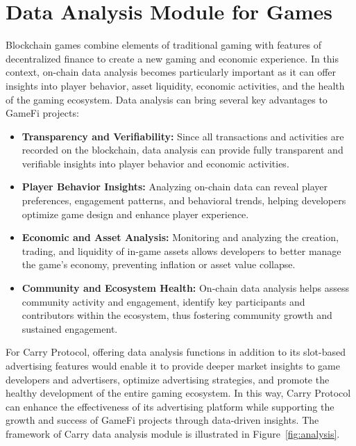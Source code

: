 \section{Data Analysis Module for Games}

Blockchain games combine elements of traditional gaming with features of decentralized finance to create a new gaming and economic experience. In this context, on-chain data analysis becomes particularly important as it can offer insights into player behavior, asset liquidity, economic activities, and the health of the gaming ecosystem. Data analysis can bring several key advantages to GameFi projects:
\begin{itemize}
    \item \textbf{Transparency and Verifiability:} Since all transactions and activities are recorded on the blockchain, data analysis can provide fully transparent and verifiable insights into player behavior and economic activities.
\item \textbf{Player Behavior Insights:} Analyzing on-chain data can reveal player preferences, engagement patterns, and behavioral trends, helping developers optimize game design and enhance player experience.
\item \textbf{Economic and Asset Analysis:} Monitoring and analyzing the creation, trading, and liquidity of in-game assets allows developers to better manage the game's economy, preventing inflation or asset value collapse.
\item \textbf{Community and Ecosystem Health:} On-chain data analysis helps assess community activity and engagement, identify key participants and contributors within the ecosystem, thus fostering community growth and sustained engagement.
\end{itemize}

For Carry Protocol, offering data analysis functions in addition to its slot-based advertising features would enable it to provide deeper market insights to game developers and advertisers, optimize advertising strategies, and promote the healthy development of the entire gaming ecosystem. In this way, Carry Protocol can enhance the effectiveness of its advertising platform while supporting the growth and success of GameFi projects through data-driven insights. The framework of Carry data analysis module is illustrated in Figure~\ref{fig:analysis}.


